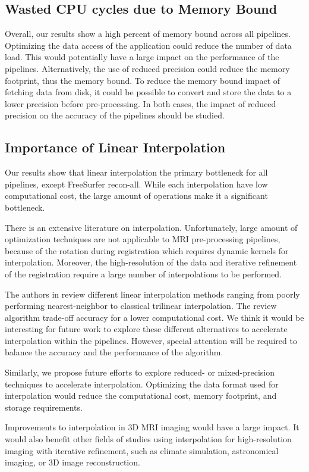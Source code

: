 \documentclass[conference]{IEEEtran}
\begin{document}
\subsection{Wasted CPU cycles due to Memory Bound}
Overall, our results show a high percent of memory bound across all pipelines.
Optimizing the data access of the application could reduce the number of data load. This would potentially have a large impact on the performance of the pipelines. Alternatively, the use of reduced precision could reduce the memory footprint, thus the memory bound. To reduce the memory bound impact of fetching data from disk, it could be possible to convert and store the data to a lower precision before pre-processing. In both cases, the impact of reduced precision on the accuracy of the pipelines should be studied.

\subsection{Importance of Linear Interpolation}
Our results show that linear interpolation the primary bottleneck for all pipelines, except FreeSurfer recon-all. While each interpolation have low computational cost, the large amount of operations make it a significant bottleneck.

There is an extensive literature on interpolation. Unfortunately, large amount of optimization techniques are not applicable to MRI pre-processing pipelines, because of the rotation during registration which requires dynamic kernels for interpolation. Moreover, the high-resolution of the data and iterative refinement of the registration require a large number of interpolations to be performed.

The authors in \cite{Canelhas2018-vs} review different linear interpolation methods ranging from poorly performing nearest-neighbor to classical trilinear interpolation. The review algorithm trade-off accuracy for a lower computational cost. We think it would be interesting for future work to explore these different alternatives to accelerate interpolation within the pipelines. However, special attention will be required to balance the accuracy and the performance of the algorithm.

Similarly, we propose future efforts to explore reduced- or mixed-precision techniques to accelerate interpolation. Optimizing the data format used for interpolation would reduce the computational cost, memory footprint, and storage requirements.

Improvements to interpolation in 3D MRI imaging would have a large impact. It would also benefit other fields of studies using interpolation for high-resolution imaging with iterative refinement, such as climate simulation, astronomical imaging, or 3D image reconstruction.
\end{document}
